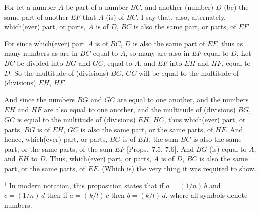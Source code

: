 \begin{Parallel}{}{}
{\epsfysize=2in
\centerline{}

For let a number $A$ be part of a number $BC$, and another (number) $D$ (be) the same
part of another $EF$ that $A$ (is) of $BC$. I say that, also, alternately, which(ever) part, or
parts, $A$ is of $D$, $BC$ is also the same part, or parts, of $EF$.

For since which(ever) part $A$ is of $BC$, $D$ is also the same part of $EF$, thus
as many numbers as are in $BC$ equal to $A$, so many are also in $EF$ equal to
$D$. Let $BC$ be divided into $BG$ and $GC$, equal to $A$, and $EF$ into
$EH$ and $HF$, equal to $D$. So the multitude of (divisions) $BG$, $GC$ will be
equal to the multitude of (divisions) $EH$, $HF$.

And since the numbers $BG$ and $GC$ are equal to one another, and
the numbers $EH$ and $HF$ are also equal to one another, and the
multitude of (divisions) $BG$, $GC$ is equal to the multitude of (divisions)
$EH$, $HC$, thus which(ever) part, or parts, $BG$ is of $EH$, $GC$ is also
the same part, or the same parts, of $HF$. And hence, which(ever)
part, or parts, $BG$ is of $EH$, the sum $BC$ is also the same
part, or the same parts, of the sum $EF$ [Props.~7.5, 7.6]. And $BG$ (is) equal to $A$, and $EH$ to $D$.
 Thus, which(ever) part, or parts, $A$ is of $D$, $BC$ is also the same part, or
 the same parts, of $EF$. (Which is) the very thing it was required to show.}
\end{Parallel}
{\footnotesize\noindent$^\dag$ In modern notation, this
proposition states that if $a=(1/n)\,b$ and $c=(1/n)\,d$ then if $a=(k/l)\,c$
then $b = (k/l)\,d$, where all symbols denote numbers.}


